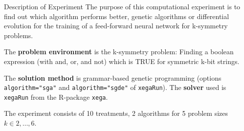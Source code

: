 \begin{frame}
\vspace*{2mm}
\begin{block}{
Description of Experiment
}
The purpose of this computational experiment is to find out
which algorithm performs better, genetic algorithms or differential evolution
for the training of a feed-forward neural network for k-symmetry problems.
 
The {\bf problem environment} is the k-symmetry problem: 
Finding a boolean expression (with and, or, and not)
which is TRUE for symmetric k-bit strings.
 
The {\bf solution method} is grammar-based genetic programming
(options {\tt algorithm="sga"} and {\tt algorithm="sgde"}  of {\tt xegaRun}).
The {\bf solver} used is {\tt xegaRun} from the R-package {\tt xega}.
 
The experiment consists of 10 treatments, 2 algorithms for 5 problem sizes $k\in 2,\dots, 6$.
\end{block}
\end{frame}